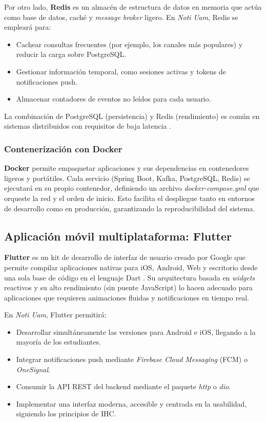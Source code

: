 Por otro lado, \textbf{Redis} es un almacén de estructura de datos en memoria que actúa como base de datos, caché y \textit{message broker} ligero. En \textit{Noti Uam}, Redis se empleará para:

\begin{itemize}
    \item Cachear consultas frecuentes (por ejemplo, los canales más populares) y reducir la carga sobre PostgreSQL.
    \item Gestionar información temporal, como sesiones activas y tokens de notificaciones push.
    \item Almacenar contadores de eventos no leídos para cada usuario.
\end{itemize}

La combinación de PostgreSQL (persistencia) y Redis (rendimiento) es común en sistemas distribuidos con requisitos de baja latencia \cite{tanenbaum2023distributed}.

\subsubsection{Contenerización con Docker}

\textbf{Docker} permite empaquetar aplicaciones y sus dependencias en contenedores ligeros y portátiles. Cada servicio (Spring Boot, Kafka, PostgreSQL, Redis) se ejecutará en su propio contenedor, definiendo un archivo \textit{docker-compose.yml} que orqueste la red y el orden de inicio. Esto facilita el despliegue tanto en entornos de desarrollo como en producción, garantizando la reproducibilidad del sistema.

\subsection{Aplicación móvil multiplataforma: Flutter}

\textbf{Flutter} es un kit de desarrollo de interfaz de usuario creado por Google que permite compilar aplicaciones nativas para iOS, Android, Web y escritorio desde una sola base de código en el lenguaje Dart \cite{flutter2024docs}. Su arquitectura basada en \textit{widgets} reactivos y su alto rendimiento (sin puente JavaScript) lo hacen adecuado para aplicaciones que requieren animaciones fluidas y notificaciones en tiempo real.

En \textit{Noti Uam}, Flutter permitirá:

\begin{itemize}
    \item Desarrollar simultáneamente las versiones para Android e iOS, llegando a la mayoría de los estudiantes.
    \item Integrar notificaciones push mediante \textit{Firebase Cloud Messaging} (FCM) o \textit{OneSignal}.
    \item Consumir la API REST del backend mediante el paquete \textit{http} o \textit{dio}.
    \item Implementar una interfaz moderna, accesible y centrada en la usabilidad, siguiendo los principios de IHC.
\end{itemize}

